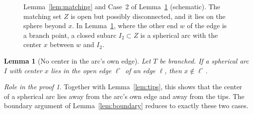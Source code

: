 \documentclass[11pt]{amsart}
\newtheorem{lemma}[theorem]{Lemma}
\theoremstyle{definition}
\theoremstyle{remark}
\newtheorem*{role}{Role in the proof}
\begin{document}
\begin{figure}[ht]
\centering
{}
\caption{Lemma~\ref{lem:matching} and Case~2 of Lemma~\ref{lem:ownedge} (schematic). The matching set $Z$ is open but possibly disconnected, and it lies on the sphere beyond $x$. In Lemma~\ref{lem:ownedge}, where the other end $w$ of the edge is a branch point, a closed subarc $I_2\subset Z$ is a spherical arc with the center $x$ between $w$ and $I_2$.}\label{fig:ownedge}
\end{figure}

\begin{lemma}[No center in the arc's own edge]\label{lem:ownedge}
Let $T$ be branched. If a spherical arc $I$ with center $x$ lies in the open edge $\ell^\circ$ of an edge $\ell$, then $x\notin\ell^\circ$.
\end{lemma}

\begin{role}
Together with Lemma~\ref{lem:tips}, this shows that the center of a spherical arc lies away from the arc's own edge and away from the tips. The boundary argument of Lemma~\ref{lem:boundary} reduces to exactly these two cases.
\end{role}
\end{document}
